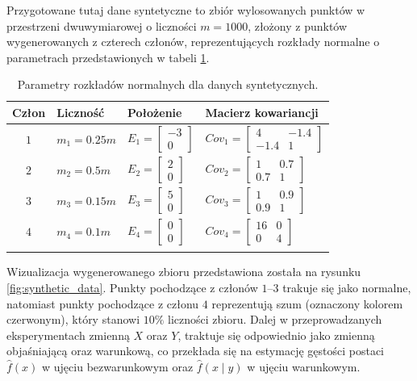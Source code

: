 \documentclass[12pt,a4paper,oneside]{book}
\theoremstyle{definition}
\begin{document}
Przygotowane tutaj dane syntetyczne to zbiór wylosowanych punktów w przestrzeni dwuwymiarowej o liczności $m=1000$, złożony z punktów wygenerowanych z czterech członów, reprezentujących rozkłady normalne o parametrach przedstawionych w tabeli \ref{table:synthetic_data_params}.
\begin{table}[H]
\caption{Parametry rozkładów normalnych dla danych syntetycznych.}
\centering
\begin{tabular}{ clll }
\toprule
\textbf{Człon} & \textbf{Liczność} & \textbf{Położenie} & \textbf{Macierz kowariancji} \\ 
\toprule
\addlinespace[0.2cm]
$1$ & $m_1 = 0.25m$ & $E_1 = \begin{bmatrix} -3 \\ 0 \end{bmatrix}$ & $Cov_1 = \begin{bmatrix} 4 & -1.4 \\ -1.4 & 1 \end{bmatrix}$ \\
\addlinespace[0.2cm]
$2$ & $m_2 = 0.5m$ & $E_2 = \begin{bmatrix} 2 \\ 0 \end{bmatrix}$ & $Cov_2 = \begin{bmatrix} 1 & 0.7 \\ 0.7 & 1 \end{bmatrix}$ \\
\addlinespace[0.2cm]
$3$ & $m_3 = 0.15m$ & $E_3 = \begin{bmatrix} 5 \\ 0 \end{bmatrix}$ & $Cov_3 = \begin{bmatrix} 1 & 0.9 \\ 0.9 & 1 \end{bmatrix}$ \\
\addlinespace[0.2cm]
$4$ & $m_4 = 0.1m$ & $E_4 = \begin{bmatrix} 0 \\ 0 \end{bmatrix}$ & $Cov_4 = \begin{bmatrix} 16 & 0 \\ 0 & 4 \end{bmatrix}$ \\
\addlinespace[0.1cm]
\bottomrule
\end{tabular}
\label{table:synthetic_data_params}
\end{table}
\noindent Wizualizacja wygenerowanego zbioru przedstawiona została na rysunku \ref{fig:synthetic_data}. Punkty pochodzące z członów $1$--$3$ trakuje się jako normalne, natomiast punkty pochodzące z członu $4$ reprezentują szum (oznaczony kolorem czerwonym), który stanowi $10\%$ liczności zbioru. Dalej w przeprowadzanych eksperymentach zmienną $X$ oraz $Y$, traktuje się odpowiednio jako zmienną objaśniającą oraz warunkową, co przekłada się na estymację gęstości postaci $\hat{f}(x)$ w ujęciu bezwarunkowym oraz $\hat{f}(x \mid y)$ w ujęciu warunkowym.
\end{document}
